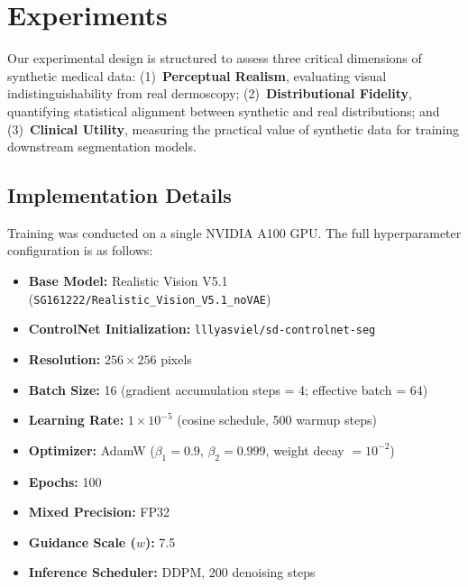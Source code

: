 \section{Experiments}

Our experimental design is structured to assess three critical dimensions of synthetic medical data: (1)~\textbf{Perceptual Realism}, evaluating visual indistinguishability from real dermoscopy; (2)~\textbf{Distributional Fidelity}, quantifying statistical alignment between synthetic and real distributions; and (3)~\textbf{Clinical Utility}, measuring the practical value of synthetic data for training downstream segmentation models.

\subsection{Implementation Details}

Training was conducted on a single NVIDIA A100 GPU. The full hyperparameter configuration is as follows:

\begin{itemize}
    \item \textbf{Base Model:} Realistic Vision V5.1 (\texttt{SG161222/Realistic\_Vision\_V5.1\_noVAE})
    \item \textbf{ControlNet Initialization:} \texttt{lllyasviel/sd-controlnet-seg}
    \item \textbf{Resolution:} $256 \times 256$ pixels
    \item \textbf{Batch Size:} 16 (gradient accumulation steps = 4; effective batch = 64)
    \item \textbf{Learning Rate:} $1\times10^{-5}$ (cosine schedule, 500 warmup steps)
    \item \textbf{Optimizer:} AdamW ($\beta_1=0.9$, $\beta_2=0.999$, weight decay $=10^{-2}$)
    \item \textbf{Epochs:} 100
    \item \textbf{Mixed Precision:} FP32
    \item \textbf{Guidance Scale ($w$):} 7.5
    \item \textbf{Inference Scheduler:} DDPM, 200 denoising steps
\end{itemize}

